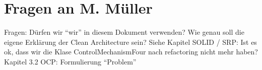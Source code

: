 \newpage
\titlespacing*{\chapter}{0pt}{-30mm}{10pt}
  
\chapter{Fragen an M. Müller}
\pagestyle{scrheadings}
\clearscrheadfoot
{}
\setcounter{page}{9}
\ofoot[\pagemark]{\pagemark}
\onehalfspacing

Fragen: Dürfen wir \enquote{wir} in diesem Dokument verwenden? Wie genau soll die eigene Erklärung der Clean Architecture sein? Siehe Kapitel SOLID / SRP: Ist es ok, dass wir die Klase ControlMechanismFour nach refactoring nicht mehr haben? Kapitel 3.2 OCP: Formulierung \enquote{Problem}